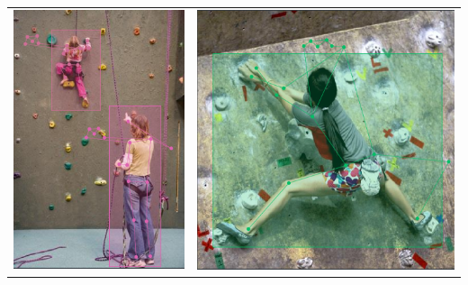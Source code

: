 \documentclass[a4paper,12pt]{article}
\begin{document}
\begin{center}
\begin{tabular}{cc}
\includegraphics[scale=0.3]{back_multiple.PNG}
&
\includegraphics[scale=0.3]{back_single.PNG}

\end{tabular}
\end{center}
\end{document}
